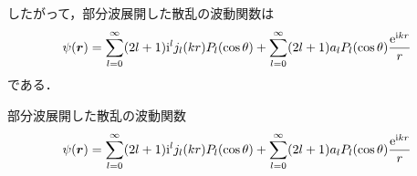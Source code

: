 \documentclass{report}
\begin{document}
  したがって，部分波展開した散乱の波動関数は
  \begin{align}
    \psi(\bm{r}) = \sum_{l = 0}^{\infty} (2l + 1)\mathrm{i}^l j_l(kr)P_l(\cos\theta) + \sum_{l = 0}^{\infty} (2l + 1)a_l P_l(\cos\theta) \frac{\mathrm{e}^{\mathrm{i} kr}}{r}
  \end{align}
  である．
  \begin{itembox}[l]{部分波展開した散乱の波動関数}
  \begin{align}
    \psi(\bm{r}) = \sum_{l = 0}^{\infty} (2l + 1)\mathrm{i}^l j_l(kr)P_l(\cos\theta) + \sum_{l = 0}^{\infty} (2l + 1)a_l P_l(\cos\theta) \frac{\mathrm{e}^{\mathrm{i} kr}}{r}\label{PartialWave}
  \end{align}
  \end{itembox}
\end{document}
